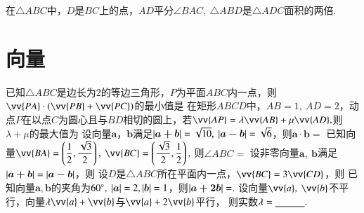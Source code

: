 \documentclass{BHCexam}
\begin{document}
\begin{questions}
\qs 在$\triangle ABC$中，$ D $是$ BC $上的点，$ AD $平分$ \angle BAC ,~\triangle ABD$是$ \triangle ADC $面积的两倍.
\end{questions}

\section{向量}
\begin{questions}
	\qs 已知$\triangle ABC$是边长为$2$的等边三角形，$P$为平面$ABC$内一点，则$\vv{PA}\cdot\left(\vv{PB}+\vv{PC}\right)$的最小值是\xx
	\qs 在矩形$ ABCD $中，$ AB=1,~AD=2 $，动点$ P $在以点$C $为圆心且与$ BD $相切的圆上，若$ \vv{AP}=\lambda\vv{AB}+\mu\vv{AD} ,$则$ \lambda+\mu $的最大值为\xx
	\qs 设向量$\bm{a}$，$\bm{b}$满足$ \left| \bm{a+b} \right|=\sqrt{10},~\left| \bm{a-b} \right|=\sqrt{6} $，则$ \bm{a\cdot b}= $\xx
	\qs 已知向量$ \vv{BA}=\left(\dfrac{1}{2},\dfrac{\sqrt{3}}{2}\right),~\vv{BC}=\left(\dfrac{\sqrt{3}}{2},\dfrac{1}{2}\right) ,~$则$ \angle ABC= $\xx
	\qs 设非零向量$ \bm{a,~b} $满足$ \left| \bm{a+b} \right|=\left| \bm{a-b} \right| $，则\xx
	\qs 设$ D $是$\triangle ABC$所在平面内一点，$ \vv{BC}=3\vv{CD} $，则\xx
	\qs 已知向量$\bm{ a},\bm{b}$的夹角为$ 60^{\circ} ,~\left| \bm{a} \right|=2,\left| \bm{b} \right|=1$，则$ \left| \bm{a+2b} \right|= $\tk.
	\qs 设向量$ \vv{a},~\vv{b} $不平行，向量$ \lambda\vv{a}+\vv{b} $与$ \vv{a}+2\vv{b} $平行， 则实数$ \lambda=\underline{\hspace{3em}}. $
\end{questions}
\end{document}
